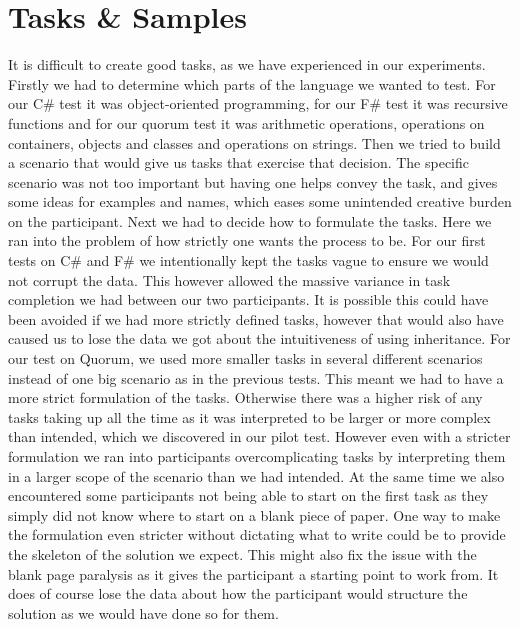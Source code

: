 \section{Tasks \& Samples}
\label{Discussion:TaskSamples}
It is difficult to create good tasks, as we have experienced in our experiments.
Firstly we had to determine which parts of the language we wanted to test.
For our C\# test it was object-oriented programming, for our F\# test it was recursive functions and for our quorum test it was arithmetic operations, operations on containers, objects and classes and operations on strings.
Then we tried to build a scenario that would give us tasks that exercise that decision.
The specific scenario was not too important but having one helps convey the task, and gives some ideas for examples and names, which eases some unintended creative burden on the participant.
Next we had to decide how to formulate the tasks.
Here we ran into the problem of how strictly one wants the process to be.
For our first tests on C\# and F\# we intentionally kept the tasks vague to ensure we would not corrupt the data.
This however allowed the massive variance in task completion we had between our two participants.
It is possible this could have been avoided if we had more strictly defined tasks, however that would also have caused us to lose the data we got about the intuitiveness of using inheritance.
For our test on Quorum, we used more smaller tasks in several different scenarios instead of one big scenario as in the previous tests.
This meant we had to have a more strict formulation of the tasks.
Otherwise there was a higher risk of any tasks taking up all the time as it was interpreted to be larger or more complex than intended, which we discovered in our pilot test.
However even with a stricter formulation we ran into participants overcomplicating tasks by interpreting them in a larger scope of the scenario than we had intended.
At the same time we also encountered some participants not being able to start on the first task as they simply did not know where to start on a blank piece of paper.
One way to make the formulation even stricter without dictating what to write could be to provide the skeleton of the solution we expect.
This might also fix the issue with the blank page paralysis as it gives the participant a starting point to work from.
It does of course lose the data about how the participant would structure the solution as we would have done so for them.

